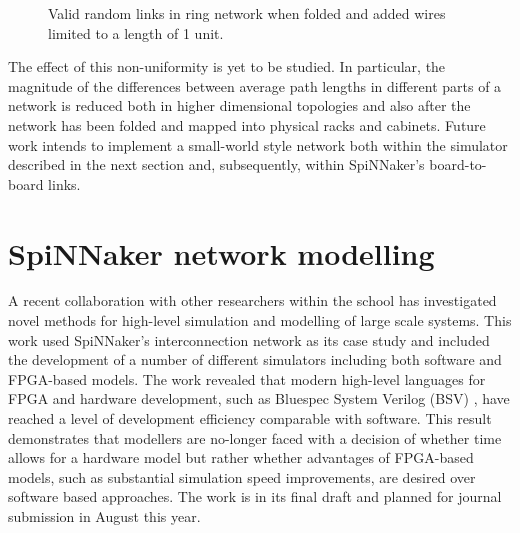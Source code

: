 			\begin{figure}
				\center
				
				\caption[Valid random links in a folded ring network with short
				wires.]{Valid random links in ring network when folded and added wires
				limited to a length of 1 unit.}
				\label{fig:ringNetworkLimitedWires}
			\end{figure}
			
			The effect of this non-uniformity is yet to be studied. In particular, the
			magnitude of the differences between average path lengths in different
			parts of a network is reduced both in higher dimensional topologies and
			also after the network has been folded and mapped into physical racks and
			cabinets. Future work intends to implement a small-world style network
			both within the simulator described in the next section and, subsequently,
			within SpiNNaker's board-to-board links.
	
	
	\section{SpiNNaker network modelling}
		
		
		A recent collaboration with other researchers within the school has
		investigated novel methods for high-level simulation and modelling of large
		scale systems. This work used SpiNNaker's interconnection network as its
		case study and included the development of a number of different simulators
		including both software and FPGA-based models. The work revealed that modern
		high-level languages for FPGA and hardware development, such as Bluespec
		System Verilog (BSV) \cite{nikhil04}, have reached a level of development
		efficiency comparable with software. This result demonstrates that modellers
		are no-longer faced with a decision of whether time allows for a hardware
		model but rather whether advantages of FPGA-based models, such as
		substantial simulation speed improvements, are desired over software based
		approaches.  The work is in its final draft and planned for journal
		submission in August this year.
		
